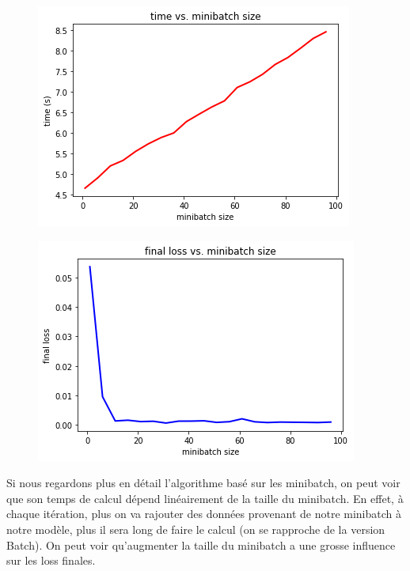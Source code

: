 \documentclass[french,12pt]{article}
\begin{document}
\begin{figure}[ht]
\centering
\begin{minipage}{.45\textwidth}
	\centering
	\includegraphics[width=\textwidth]{mini-batch_time.png}
	\label{fig:mini-batch_time}
\end{minipage}
\hfill
\begin{minipage}{.45\textwidth}
	\centering
	\includegraphics[width=\textwidth]{mini-batch_loss.png}
	\label{fig:mini-batch_loss}
\end{minipage}
\end{figure}

Si nous regardons plus en détail l'algorithme basé sur les minibatch, on peut voir que son temps de calcul dépend linéairement de la taille du minibatch. En effet, à chaque itération, plus on va rajouter des données provenant de notre minibatch à notre modèle, plus il sera long de faire le calcul (on se rapproche de la version Batch). On peut voir qu'augmenter la taille du minibatch a une grosse influence sur les loss finales.
\end{document}
